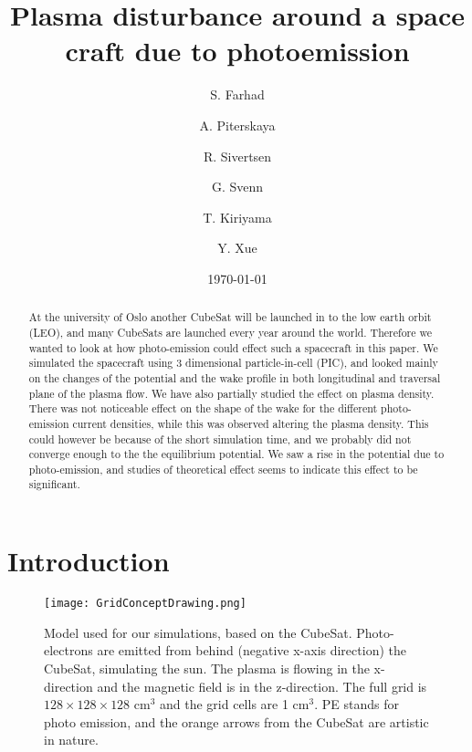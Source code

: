 \documentclass[aip, 
rsi, 
amsmath,
amssymb,
longbibliography,
reprint]{revtex4-1}
\begin{document}
\title[4th 4DSpace Workshop -- Team Godzilla -- Final Report]{Plasma disturbance around a space craft due to photoemission}

\author{S. Farhad} 
\author{A. Piterskaya}
\author{R. Sivertsen}
\author{G. Svenn}

\author{T. Kiriyama}
\author{Y. Xue}

\date{\today}

\begin{abstract}
At the university of Oslo another CubeSat will be launched in to the low earth orbit (LEO), and many CubeSats are launched every year around the world. Therefore we wanted to look at how photo-emission could effect such a spacecraft in this paper. We simulated the spacecraft using 3 dimensional particle-in-cell (PIC), and looked mainly on the changes of the potential and the wake profile in both longitudinal and traversal plane of the plasma flow. We have also partially studied the effect on plasma density.\\ 

There was not noticeable effect on the shape of the wake for the different photo-emission current densities, while this was observed altering the plasma density. This could however be because of the short simulation time, and we probably did not converge enough to the the equilibrium potential. We saw a rise in the potential due to photo-emission, and studies of theoretical effect seems to indicate this effect to be significant. 
\end{abstract}

\maketitle

\section{\label{sec:intro} Introduction}

\begin{figure*}[!ht]
\texttt{[image: GridConceptDrawing.png]}
\caption{Model used for our simulations, based on the CubeSat. Photo-electrons are emitted from behind (negative x-axis direction) the CubeSat, simulating the sun. The plasma is flowing in the x-direction and the magnetic field is in the z-direction. The full grid is $128 \times 128 \times 128$ cm$^3$ and the grid cells are 1 cm$^3$. PE stands for photo emission, and the orange arrows from the CubeSat are artistic in nature.\label{fig:model}}
\end{figure*}
\end{document}
